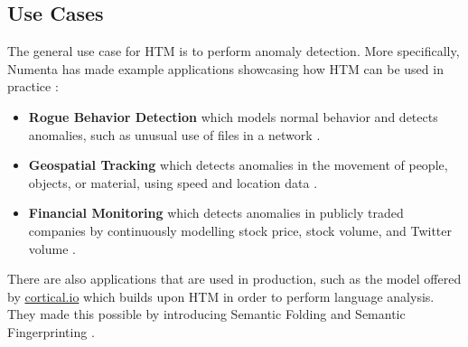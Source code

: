 \subsection{Use Cases}
The general use case for HTM is to perform anomaly detection. More specifically, Numenta has made example applications showcasing how HTM can be used in practice \cite{numenta_example_apps}:
\begin{itemize}
    \item \textbf{Rogue Behavior Detection} which models normal behavior and detects anomalies, such as unusual use of files in a network \cite{htm_rogue}.
    \item \textbf{Geospatial Tracking} which detects anomalies in the movement of people, objects, or material, using speed and location data \cite{htm_geospatial}.
    \item \textbf{Financial Monitoring} which detects anomalies in publicly traded companies by continuously modelling stock price, stock volume, and Twitter volume \cite{htm_finance}.
\end{itemize}
There are also applications that are used in production, such as the model offered by \href{www.cortical.io}{cortical.io} which builds upon HTM in order to perform language analysis. They made this possible by introducing Semantic Folding and Semantic Fingerprinting \cite{semantic_folding}.
